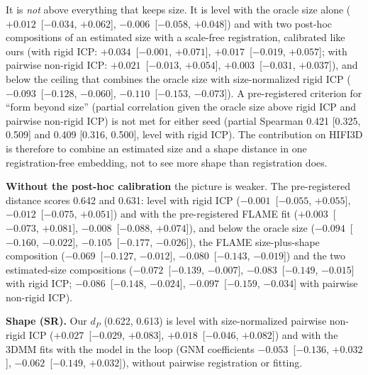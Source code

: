 \documentclass[10pt,twocolumn,letterpaper]{article}
\newcommand{\pd}[3]{$#1$~[$#2$, $#3$]}  %
\begin{document}
It is \emph{not} above everything that keeps size. It is level with the oracle size alone (\pd{+0.012}{-0.034}{+0.062}, \pd{-0.006}{-0.058}{+0.048}) and with two post-hoc compositions of an estimated size with a scale-free registration, calibrated like ours (with rigid ICP: \pd{+0.034}{-0.001}{+0.071}, \pd{+0.017}{-0.019}{+0.057}; with pairwise non-rigid ICP: \pd{+0.021}{-0.013}{+0.054}, \pd{+0.003}{-0.031}{+0.037}), and below the ceiling that combines the oracle size with size-normalized rigid ICP (\pd{-0.093}{-0.128}{-0.060}, \pd{-0.110}{-0.153}{-0.073}). A pre-registered criterion for ``form beyond size'' (partial correlation given the oracle size above rigid ICP and pairwise non-rigid ICP) is not met for either seed (partial Spearman 0.421 [0.325, 0.509] and 0.409 [0.316, 0.500], level with rigid ICP). The contribution on HIFI3D is therefore to combine an estimated size and a shape distance in one registration-free embedding, not to see more shape than registration does.

\textbf{Without the post-hoc calibration} the picture is weaker. The pre-registered distance scores 0.642 and 0.631: level with rigid ICP (\pd{-0.001}{-0.055}{+0.055}, \pd{-0.012}{-0.075}{+0.051}) and with the pre-registered FLAME fit (\pd{+0.003}{-0.073}{+0.081}, \pd{-0.008}{-0.088}{+0.074}), and below the oracle size (\pd{-0.094}{-0.160}{-0.022}, \pd{-0.105}{-0.177}{-0.026}), the FLAME size-plus-shape composition (\pd{-0.069}{-0.127}{-0.012}, \pd{-0.080}{-0.143}{-0.019}) and the two estimated-size compositions (\pd{-0.072}{-0.139}{-0.007}, \pd{-0.083}{-0.149}{-0.015} with rigid ICP; \pd{-0.086}{-0.148}{-0.024}, \pd{-0.097}{-0.159}{-0.034} with pairwise non-rigid ICP).

\textbf{Shape (SR).} Our $d_P$ (0.622, 0.613) is level with size-normalized pairwise non-rigid ICP (\pd{+0.027}{-0.029}{+0.083}, \pd{+0.018}{-0.046}{+0.082}) and with the 3DMM fits with the model in the loop (GNM coefficients \pd{-0.053}{-0.136}{+0.032}, \pd{-0.062}{-0.149}{+0.032}), without pairwise registration or fitting.
\end{document}
